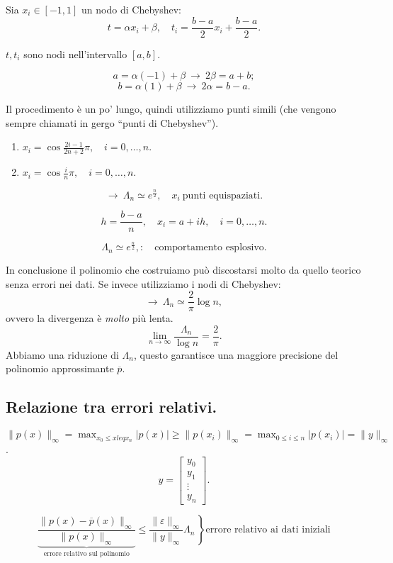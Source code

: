 Sia $x_i \in [-1,1]$ un nodo di Chebyshev:
\[t = \alpha x_i + \beta, \quad t_i = \frac{b-a}{2}x_i + \frac{b-a}{2}.\]

$t, t_i$ sono nodi nell'intervallo $[a,b]$.

\[
a = \alpha(-1) + \beta \ \longrightarrow \ 2\beta = a+b;
\]
\[
b = \alpha(1) + \beta \ \longrightarrow \ 2\alpha = b-a.
\]

Il procedimento è un po' lungo, quindi utilizziamo punti simili (che vengono
sempre chiamati in gergo ``punti di Chebyshev'').
\begin{enumerate}
\item $x_i = \cos \frac{2i - 1}{2n +2} \pi, \quad i = 0,\ldots, n.$
\item $x_i = \cos \frac{i}{n} \pi, \quad i = 0,\ldots, n.$
\end{enumerate}
\[
\longrightarrow \ \Lambda_n \simeq e^{\frac{n}{2}}, \quad x_i \ \textrm{punti
equispaziati.}
\]

\[h = \frac{b-a}{n}, \quad x_i = a +ih, \quad i = 0,\ldots,n.\]

\[
\Lambda_n \simeq e^{\frac{n}{2}}, \colon\quad \textrm{comportamento esplosivo.}
\]

In conclusione il polinomio che costruiamo può discostarsi molto da quello 
teorico senza errori nei dati. Se invece utilizziamo i nodi di Chebyshev:
\[\longrightarrow \ \Lambda_n \simeq \frac{2}{\pi}\log n,\]
ovvero la divergenza è \emph{molto} più lenta.
\[\lim_{n \to \infty}\frac{\Lambda_n}{\log n}  =
\frac{2}{\pi}.\]
Abbiamo una riduzione di $\Lambda_n$, questo garantisce una maggiore 
precisione del polinomio approssimante $\overline{p}$.

\subsection{Relazione tra errori relativi.}
$\|p(x)\|_{\infty} = \max_{x_0 \leq x leq x_n}|p(x)| \geq \|p(x_i)\|_{\infty} =
\max_{0 \leq i \leq n}|p(x_i)| = \|y\|_{\infty}$.
\[y = \left[
\begin{array}{c}
y_0 \\
y_1 \\
\vdots \\
y_n
\end{array}\right].
\]

\begin{osse}

\[
\underbrace{\frac{\|p(x) - \overline{p}(x)\|_{\infty}}{\|p(x)\|_{\infty}}
}_{\textrm{errore relativo sul polinomio}} \leq \left.\frac{\|\varepsilon\|_\infty}{\|y
\|_{\infty}}\Lambda_n\,\right\}\textrm{errore relativo ai dati iniziali}
\]
\end{osse}

